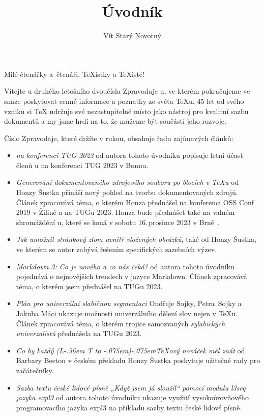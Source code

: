 \documentclass{csbulletin}
\makeatletter
\DeclareRobustCommand{\La}{L\kern-.36em%
        {\sbox\z@ T%
         \vbox to\ht\z@{\hbox{\check@mathfonts
                              \fontsize\sf@size\z@
                              \math@fontsfalse\selectfont
                              A}%
                        \vss}%
        }}
\def\AllTeX{(\La\kern-.075em)\kern-.075em\TeX}
\makeatother
\begin{document}
\title{Úvodník}
\author{Vít Starý Novotný}
\maketitle

Milé čtenářky a~čtenáři, \TeX istky a \TeX isté!

\medskip

Vítejte u druhého letošního dvoučísla Zpravodaje \CSTUG u, ve kterém pokračujeme ve snaze poskytovat cenné informace a poznatky ze světa \TeX u. 45 let od svého vzniku si \TeX{} udržuje své nezastupitelné místo jako nástroj pro kvalitní sazbu dokumentů a my jsme hrdí na to, že můžeme být součástí jeho rozvoje.

Číslo Zpravodaje, které držíte v rukou, obsahuje řadu zajímavých článků:

\begin{itemize}
  \item \emph{\CSTUG{} na konferenci TUG 2023} od autora tohoto úvodníku popisuje letní účast členů \CSTUG u na konferenci TUG 2023 v Bonnu.
  \item \emph{Generování dokumentovaného zdrojového souboru po blocích v \TeX u} od Honzy Šustka přináší nový pohled na tvorbu dokumentovaných zdrojů. Článek zpracovává téma, o kterém Honza přednášel na konferenci OSS Conf 2019 v Žilině a na TUGu 2023. Honza bude přednášet také na valném shromáždění \CSTUG u, které se koná v sobotu 16.\,prosince 2023 v Brně~\cite{starynovotny2023valna}.
  \item \emph{Jak umožnit stránkový zlom uvnitř vložených obrázků}, také od Honzy Šustka, ve kterém se autor zabývá řešením specifických sazebních výzev.
  \item \emph{Markdown 3: Co je nového a co nás čeká?} od autora tohoto úvodníku pojednává o nejnovějších trendech v jazyce Markdown. Článek zpracovává téma, o kterém jsem přednášel na TUGu 2023.
  \item \emph{Plán pro univerzální slabičnou segmentaci} Ondřeje Sojky, Petra~Sojky a Jakuba Máci ukazuje možnosti univerzálního dělení slov nejen v \TeX u. Článek zpracovává téma, o kterém trojice samozvaných \emph{sylabických univerzalistů} přednášela na TUGu 2023.
  \item \emph{Co by každý \AllTeX ový nováček měl znát} od Barbary Beeton v českém překladu Honzy Šustka poskytuje užitečné rady pro začátečníky.
  \item \emph{Sazba textu české lidové písně „Když jsem já
sloužil“ pomocí modulu l3seq jazyka expl3} od autora tohoto úvodníku ukazuje využití vysokoúrovňového programovacího jazyka expl3 na příkladu sazby textu české lidové písně.
\end{itemize}
\end{document}
